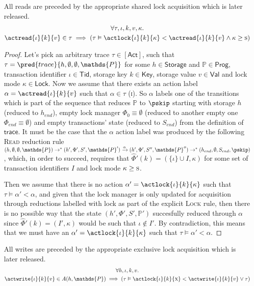 \lem \label{lem:read} All reads are preceded by the appropriate shared lock acquisition which is later released.
\begin{gather*}
\forall \tau, \iota, k, v, \kappa \ldotp \\
\actread{\iota}{k}{v} \in \tau \implies \left( \tau \vDash \actlock{\iota}{k}{\kappa} < \actread{\iota}{k}{v} \land \kappa \geq \textsc{s} \right)
\end{gather*}

\begin{proof}
Let's pick an arbitrary trace $\tau \in \mathsf{[Act]}$, such that $\tau = \pred{trace}{h, \emptyset, \emptyset, \mathds{P}}$ for some $h \in \mathsf{Storage}$ and $\mathds{P} \in \mathsf{Prog}$, transaction identifier $\iota \in \mathsf{Tid}$, storage key $k \in \mathsf{Key}$, storage value $v \in \mathsf{Val}$ and lock mode $\kappa \in \mathsf{Lock}$. Now we assume that there exists an action label $\alpha = \actread{\iota}{k}{v}$ such that $\alpha \in \tau$ (\textsc{i}). So $\alpha$ labels one of the transitions which is part of the sequence that reduces $\mathds{P}$ to $\pskip$ starting with storage $h$ (reduced to $h_{end}$), empty lock manager $\Phi_0 \equiv \emptyset$ (reduced to another empty one $\Phi_{end} \equiv \emptyset$) and empty transactions' state (reduced to $S_{end}$) from the definition of $\mathsf{trace}$. It must be the case that the $\alpha$ action label was produced by the following \textsc{Read} reduction rule $(h, \emptyset, \emptyset, \mathds{P}) \rightarrow^* (h', \Phi', S', \mathds{P}') \xrightarrow{\alpha} (h', \Phi', S'', \mathds{P}'') \rightarrow^* (h_{end}, \emptyset, S_{end}, \pskip)$, which, in order to succeed, requires that $\hat{\Phi}'(k) = (\{ \iota \} \cup I, \kappa)$ for some set of transaction identifiers $I$ and lock mode $\kappa \geq \textsc{s}$.

Then we assume that there is no action $\alpha' = \actlock{\iota}{k}{\kappa}$ such that $\tau \vDash \alpha' < \alpha$, and given that the lock manager is only updated for acquisition through reductions labelled with \textsf{lock} as part of the explicit \textsc{Lock} rule, then there is no possible way that the state $(h', \Phi', S', \mathds{P}')$ succesfully reduced through $\alpha$ since $\hat{\Phi}'(k) = (I'
, \kappa)$ would be such that $\iota \not\in I'$. By contradiction, this means that we must have an $\alpha' = \actlock{\iota}{k}{\kappa}$ such that $\tau \vDash \alpha' < \alpha$.
\end{proof}

\lem \label{lem:write} All writes are preceded by the appropriate exclusive lock acquisition which is later released.
\begin{gather*}
\forall h, \iota, k, v \ldotp \\
\actwrite{\iota}{k}{v} \in A(h, \mathds{P}) \implies \left( \tau \vDash \actlock{\iota}{k}{\textsc{x}} < \actwrite{\iota}{k}{v} \lor \tau \right)
\end{gather*}

